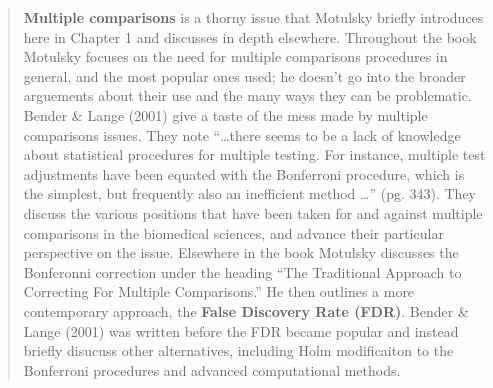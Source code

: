 \documentclass[]{book}
\theoremstyle{definition}
\theoremstyle{definition}
\theoremstyle{definition}
\theoremstyle{remark}
\begin{document}
\begin{quote}
\textbf{Multiple comparisons} is a thorny issue that Motulsky briefly
introduces here in Chapter 1 and discusses in depth elsewhere.
Throughout the book Motulsky focuses on the need for multiple
comparisons procedures in general, and the most popular ones used; he
doesn't go into the broader arguements about their use and the many ways
they can be problematic. Bender \& Lange (2001) give a taste of the mess
made by multiple comparisons issues. They note ``\ldots{}there seems to
be a lack of knowledge about statistical procedures for multiple
testing. For instance, multiple test adjustments have been equated with
the Bonferroni procedure, which is the simplest, but frequently also an
inefficient method \ldots{}'' (pg. 343). They discuss the various
positions that have been taken for and against multiple comparisons in
the biomedical sciences, and advance their particular perspective on the
issue. Elsewhere in the book Motulsky discusses the Bonferonni
correction under the heading ``The Traditional Approach to Correcting
For Multiple Comparisons.'' He then outlines a more contemporary
approach, the \textbf{False Discovery Rate (FDR)}. Bender \& Lange
(2001) was written before the FDR became popular and instead briefly
disucuss other alternatives, including Holm modificaiton to the
Bonferroni procedures and advanced computational methods.
\end{quote}


\end{document}
